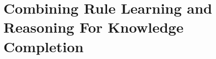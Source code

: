 \section{Combining Rule Learning and Reasoning For Knowledge Completion}
\label{sec:rules_kg_completion}